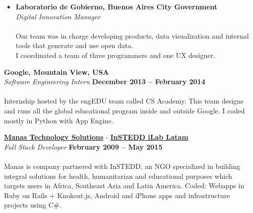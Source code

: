 \documentclass[margin,line]{resume}
\begin{document}
\begin{resume}
\begin{itemize}
\item \textbf{Laboratorio de Gobierno, Buenos Aires City Government}\vspace{2mm}\\\vspace{1mm}
\textsl{Digital Innovation Manager} \hfill \vspace{-3mm}\\\vspace{-1mm}
\\
Our team was in charge developing products, data visualization and internal tools that generate and use open data.
\\
I coordinated a team of three programmers and one UX designer. 

\end{itemize}









\textbf{Google, Mountain View, USA}\vspace{2mm}\\\vspace{1mm}
\textsl{Software Engineering Intern} \hfill \textbf{December 2013 -- February 2014}\vspace{-3mm}\\\vspace{-1mm}
\\
Internship hosted by the engEDU team called CS Academy. This team designs and runs all the global educational program inside and outside Google. I coded mostly in Python with App Engine.

\textbf{\href{http://www.manas.com.ar/}{Manas Technology Solutions}} - 
\textbf{\href{http://www.instedd.org/}{InSTEDD iLab Latam}}\vspace{2mm}\\\vspace{1mm}
\textsl{Full Stack Developer} \hfill \textbf{February 2009 -- May 2015}\vspace{-3mm}\\\vspace{-1mm}
\\
Manas is company partnered with InSTEDD, an NGO specialized in building integral solutions for health, humanitarian and educational purposes which targets users in Africa, Southeast Asia and Latin America.  
Coded: Webapps in Ruby on Rails + Knokout.js, Android and iPhone  apps and infrastructure projects using C\#.



\end{resume}
\end{document}
